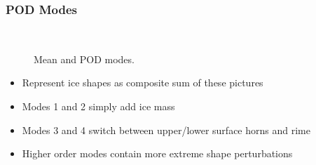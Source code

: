 \documentclass[9pt]{beamer}
\begin{document}
\begin{frame}
\frametitle{POD Modes}
\label{sec-2-5}

\vspace*{0.75cm}\begin{figure}
      \vspace*{-1.75cm} \\
      \vspace*{-0.75cm}
      \vspace*{-0.75cm}
      \vspace*{-0.75cm}
      \vspace*{-0.75cm}
      \vspace*{1cm}\caption{Mean and POD modes.}
\end{figure}

\begin{itemize}
\item Represent ice shapes as composite sum of these pictures
\item Modes 1 and 2 simply add ice mass
\item Modes 3 and 4 switch between upper/lower surface horns and rime
\item Higher order modes contain more extreme shape perturbations
\end{itemize}
\end{frame}
\end{document}
